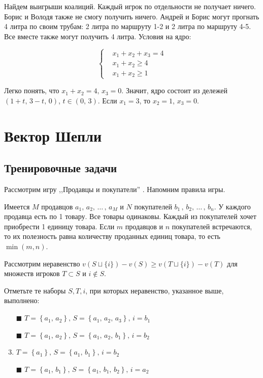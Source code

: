 	Найдем выигрыши коалиций. Каждый игрок по отдельности не получает ничего. Борис и Володя также не смогу получить ничего. Андрей и Борис могут прогнать 4 литра по своим трубам: 2 литра по маршруту 1-2 и 2 литра по маршруту 4-5. Все вместе также могут получить 4 литра. Условия на ядро:
	
	\[
	\left\{
		\begin{aligned}
			& x_1 + x_2 + x_3 = 4 \\
			& x_1 + x_2 \geq 4 \\
			& x_1 + x_2 \geq 1
		\end{aligned}
	\right.
	\]
	
	Легко понять, что $x_1 + x_2 = 4, \, x_3 = 0$. Значит, ядро состоит из дележей $(1+t,\, 3-t,\, 0)$, $t \in (0,\,3)$. Если $x_1 = 3$, то $x_2 = 1$, $x_3 = 0$.
	
	
\section{Вектор Шепли}

	\subsection{Тренировочные задачи}
	
	\task
	
	Рассмотрим игру ,,Продавцы и покупатели'' . Напомним правила игры.
	
	Имеется $M$ продавцов $a_1,\,a_2,\,\ldots\,,\,a_M$ и $N$ покупателей $b_1\,,\,b_2,\,\ldots\,,\,b_n$. У каждого продавца есть по 1 товару. Все товары одинаковы. Каждый из покупателей хочет приобрести 1 единицу товара. Если $m$ продавцов и $n$ покупателей встречаются, то их полезность равна количеству проданных единиц товара, то есть $\min(m,n)$.
	
	Рассмотрим неравенство $v(S \sqcup \{i\}) - v(S)\geq v(T \sqcup \{i\}) - v(T)$ для множеств игроков $T \subset S$ и $i \not \in S$.
	
	Отметьте те наборы $S,T,i$, при которых неравенство, указанное выше, выполнено:
	
	\begin{enumerate}[label=$\square$]
		\item[$\blacksquare$] $T = \left\{a_1,\, a_2\right\},\, S = \left\{a_1,\, a_2,\, a_3\right\},\, i = b_1$
		\item[$\blacksquare$] $T = \left\{a_1,\, a_2\right\},\, S = \left\{a_1,\,a_2,\,b_1\right\},\, i = b_2$
		\item $T=\left\{a_1\right\},\,S=\left\{a_1,\, b_1\right\},\, i = b_2$
		\item[$\blacksquare$] $T = \left\{a_1,\, b_1\right\},\, S = \left\{a_1,\, b_1,\, b_2\right\},\, i = a_2$
	\end{enumerate}

